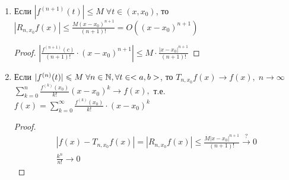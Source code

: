 \begin{follow}
    \begin{enumerate}
        \item Если $|f^{(n+1)}(t)| \leqslant M \; \forall t \in (x, x_0)$, то $|R_{n, x_0}f(x)| \leqslant \frac{M(x-x_0)^{n + 1}}{(n+1)!} = O((x - x_0)^{n + 1})$
            \begin{proof}
                $| \frac{f^{(n+1)}(c)}{(n+1)!} \cdot (x - x_0)^{n+1} | \leqslant M \cdot \frac{|x-x_0|^{n+1}}{(n+1)!}$
            \end{proof}
        \item
        Если \; $|f^{(n)}(t)| \leqslant M \; \forall n \in \mathbb{N}, \forall t \in <a, b>$, то \; $T_{n,x_0}f(x) \rightarrow f(x), \; n \rightarrow \infty$ \\

        $\sum_{k=0}^{n} \frac{f^{(k)}(x_0)}{k!} (x - x_0)^k \rightarrow f(x),$ т.е. $f(x) = \sum_{k=0}^{\infty} \frac{f^{(k)}(x_0)}{k!} \cdot (x - x_0)^k$
            \begin{proof}

                \begin{gather*}
                    |f(x) - T_{n,x_0}f(x)| = |R_{n, x_0} f(x)| \leqslant \frac{M|x-x_0|^{n+1}}{(n+1)!} \stackrel{?}{\rightarrow} 0 \\
                    \frac{k^n}{n!} \rightarrow 0
                \end{gather*}

            \end{proof}
    \end{enumerate}
\end{follow}